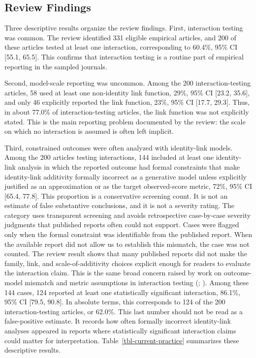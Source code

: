 \documentclass[
  man,
  longtable,
  nolmodern,
  notxfonts,
  notimes,
  colorlinks=true,linkcolor=blue,citecolor=blue,urlcolor=blue]{apa7}
\begin{document}
\subsection{Review Findings}\label{review-findings}

Three descriptive results organize the review findings. First,
interaction testing was common. The review identified 331 eligible
empirical articles, and 200 of these articles tested at least one
interaction, corresponding to 60.4\%, 95\% CI {[}55.1, 65.5{]}. This
confirms that interaction testing is a routine part of empirical
reporting in the sampled journals.

Second, model-scale reporting was uncommon. Among the 200
interaction-testing articles, 58 used at least one non-identity link
function, 29\%, 95\% CI {[}23.2, 35.6{]}, and only 46 explicitly
reported the link function, 23\%, 95\% CI {[}17.7, 29.3{]}. Thus, in
about 77.0\% of interaction-testing articles, the link function was not
explicitly stated. This is the main reporting problem documented by the
review: the scale on which no interaction is assumed is often left
implicit.

Third, constrained outcomes were often analyzed with identity-link
models. Among the 200 articles testing interactions, 144 included at
least one identity-link analysis in which the reported outcome had
formal constraints that make identity-link additivity formally incorrect
as a generative model unless explicitly justified as an approximation or
as the target observed-score metric, 72\%, 95\% CI {[}65.4, 77.8{]}.
This proportion is a conservative screening count. It is not an estimate
of false substantive conclusions, and it is not a severity rating. The
category uses transparent screening and avoids retrospective
case-by-case severity judgments that published reports often could not
support. Cases were flagged only when the formal constraint was
identifiable from the published report. When the available report did
not allow us to establish this mismatch, the case was not counted. The
review result shows that many published reports did not make the family,
link, and scale-of-additivity choices explicit enough for readers to
evaluate the interaction claim. This is the same broad concern raised by
work on outcome-model mismatch and metric assumptions in interaction
testing (;
). Among
these 144 cases, 124 reported at least one statistically significant
interaction, 86.1\%, 95\% CI {[}79.5, 90.8{]}. In absolute terms, this
corresponds to 124 of the 200 interaction-testing articles, or 62.0\%.
This last number should not be read as a false-positive estimate. It
records how often formally incorrect identity-link analyses appeared in
reports where statistically significant interaction claims could matter
for interpretation. Table~\ref{tbl-current-practice} summarizes these
descriptive results.
\end{document}
